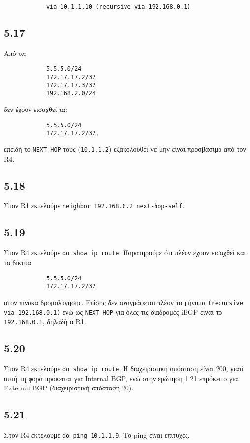 \documentclass[a4paper, 12pt]{article}
\begin{document}
		\begin{verbatim}
			via 10.1.1.10 (recursive via 192.168.0.1)
		\end{verbatim}

	\subsection*{5.17}
		Από τα:
		
		\begin{verbatim}
			5.5.5.0/24
			172.17.17.2/32
			172.17.17.3/32
			192.168.2.0/24
		\end{verbatim}
		
		δεν έχουν εισαχθεί τα:
		
		\begin{verbatim}
			5.5.5.0/24
			172.17.17.2/32,
		\end{verbatim}
		
		επειδή το \verb|NEXT_HOP| τους (\verb|10.1.1.2|) εξακολουθεί να μην είναι προσβάσιμο από τον R4.

	\subsection*{5.18}
		Στον R1 εκτελούμε \verb|neighbor 192.168.0.2 next-hop-self|.

	\subsection*{5.19}
		Στον R4 εκτελούμε \verb|do show ip route|. Παρατηρούμε ότι πλέον έχουν εισαχθεί και τα δίκτυα
		
		\begin{verbatim}
			5.5.5.0/24
			172.17.17.2/32
		\end{verbatim}
		
		στον πίνακα δρομολόγησης. Επίσης δεν αναγράφεται πλέον το μήνυμα \verb|(recursive via 192.168.0.1)| ενώ ως \verb|NEXT_HOP| για όλες τις διαδρομές iBGP είναι το \verb|192.168.0.1|, δηλαδή ο R1. 

	\subsection*{5.20}
		Στον R4 εκτελούμε \verb|do show ip route|. Η διαχειριστική απόσταση είναι 200, γιατί αυτή τη φορά πρόκειται για Internal BGP, ενώ στην ερώτηση 1.21 επρόκειτο για External BGP (διαχειριστική απόσταση 20).

	\subsection*{5.21}
		Στον R4 εκτελούμε \verb|do ping 10.1.1.9|. Το ping είναι επιτυχές.
\end{document}

